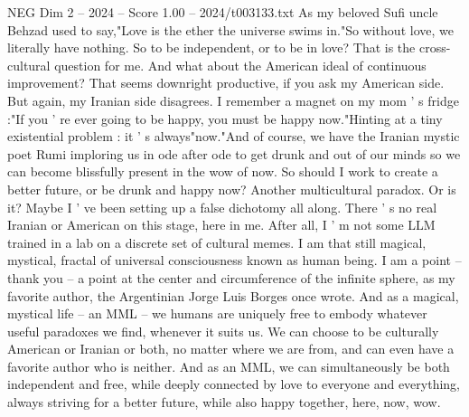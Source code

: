\begin{textsample}{NEG Dim 2 – 2024 – Score 1.00 – 2024/t003133.txt}
As my beloved Sufi uncle Behzad used to say,"Love is the ether the universe swims in."So without love, we literally have nothing.
So to be independent, or to be in love?
That is the cross-cultural question for me.
And what about the American ideal of continuous improvement?
That seems downright productive, if you ask my American side.
But again, my Iranian side disagrees.
I remember a magnet on my mom ' s fridge :"If you ' re ever going to be happy, you must be happy now."Hinting at a tiny existential problem : it ' s always"now."And of course, we have the Iranian mystic poet Rumi imploring us in ode after ode to get drunk and out of our minds so we can become blissfully present in the wow of now.
So should I work to create a better future, or be drunk and happy now?
Another multicultural paradox.
Or is it?
Maybe I ' ve been setting up a false dichotomy all along.
There ' s no real Iranian or American on this stage, here in me.
After all, I ' m not some LLM trained in a lab on a discrete set of cultural memes.
I am that still magical, mystical, fractal of universal consciousness known as human being.
I am a point -- thank you -- a point at the center and circumference of the infinite sphere, as my favorite author, the Argentinian Jorge Luis Borges once wrote.
And as a magical, mystical life -- an MML -- we humans are uniquely free to embody whatever useful paradoxes we find, whenever it suits us.
We can choose to be culturally American or Iranian or both, no matter where we are from, and can even have a favorite author who is neither.
And as an MML, we can simultaneously be both independent and free, while deeply connected by love to everyone and everything, always striving for a better future, while also happy together, here, now, wow.

\end{textsample}
